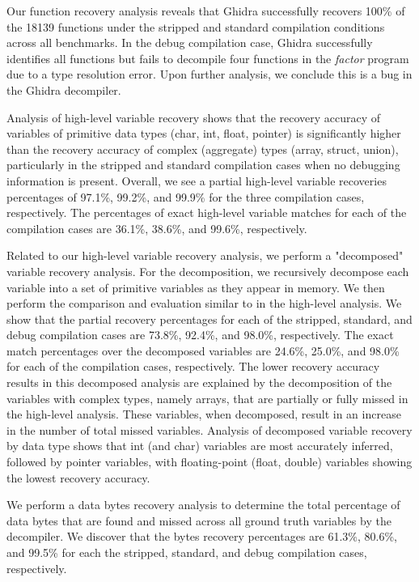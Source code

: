 \documentclass[conference]{IEEEtran}
\begin{document}
Our function recovery analysis reveals that Ghidra successfully recovers 100\% of the 18139 functions under the stripped and standard compilation conditions across all benchmarks. In the debug compilation case, Ghidra successfully identifies all functions but fails to decompile four functions in the \emph{factor} program due to a type resolution error. Upon further analysis, we conclude this is a bug in the Ghidra decompiler.

Analysis of high-level variable recovery shows that the recovery accuracy of variables of primitive data types (char, int, float, pointer) is significantly higher than the recovery accuracy of complex (aggregate) types (array, struct, union), particularly in the stripped and standard compilation cases when no debugging information is present. Overall, we see a partial high-level variable recoveries percentages of 97.1\%, 99.2\%, and 99.9\% for the three compilation cases, respectively. The percentages of exact high-level variable matches for each of the compilation cases are 36.1\%, 38.6\%, and 99.6\%, respectively.

Related to our high-level variable recovery analysis, we perform a "decomposed" variable recovery analysis. For the decomposition, we recursively decompose each variable into a set of primitive variables as they appear in memory. We then perform the comparison and evaluation similar to in the high-level analysis. We show that the partial recovery percentages for each of the stripped, standard, and debug compilation cases are 73.8\%, 92.4\%, and 98.0\%, respectively. The exact match percentages over the decomposed variables are 24.6\%, 25.0\%, and 98.0\% for each of the compilation cases, respectively. The lower recovery accuracy results in this decomposed analysis are explained by the decomposition of the variables with complex types, namely arrays, that are partially or fully missed in the high-level analysis. These variables, when decomposed, result in an increase in the number of total missed variables. Analysis of decomposed variable recovery by data type shows that int (and char) variables are most accurately inferred, followed by pointer variables, with floating-point (float, double) variables showing the lowest recovery accuracy.

We perform a data bytes recovery analysis to determine the total percentage of data bytes that are found and missed across all ground truth variables by the decompiler. We discover that the bytes recovery percentages are 61.3\%, 80.6\%, and 99.5\% for each the stripped, standard, and debug compilation cases, respectively.
\end{document}
